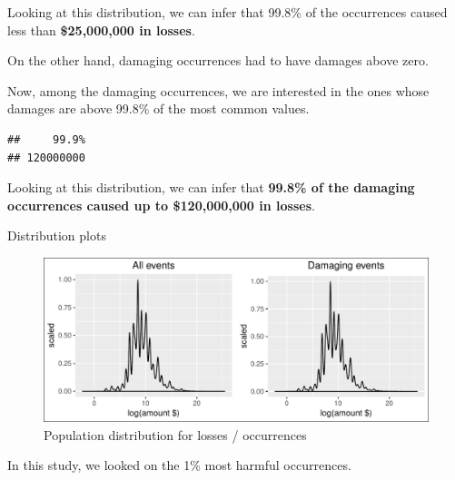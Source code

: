Looking at this distribution, we can infer that 99.8\% of the
occurrences caused less than \textbf{\$25,000,000 in losses}.

On the other hand, damaging occurrences had to have damages above zero.

Now, among the damaging occurrences, we are interested in the ones whose
damages are above 99.8\% of the most common values.

\begin{verbatim}
##     99.9% 
## 120000000
\end{verbatim}

Looking at this distribution, we can infer that \textbf{99.8\% of the
damaging occurrences caused up to \$120,000,000 in losses}.

Distribution plots

\suppressfloats
\suppressfloats\begin{figure}[htbp]
\centering
\includegraphics{readme_files/figure-latex/crop-distribution-1.pdf}
\caption{Population distribution for losses / occurrences}
\end{figure}

In this study, we looked on the 1\% most harmful occurrences.

